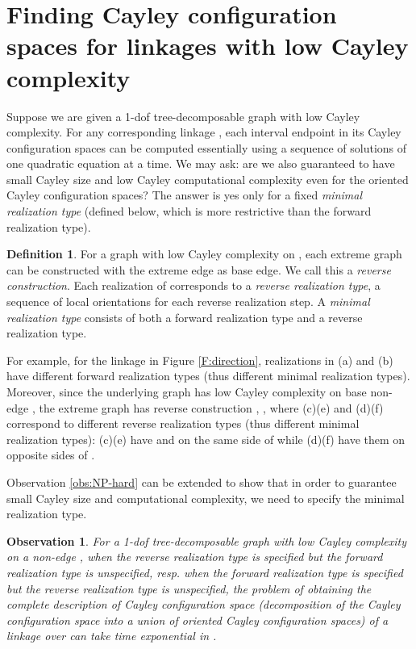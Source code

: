 \documentclass[secthm,amsthm,english]{article}
\newtheorem{observation}{Observation}
\theoremstyle{definition}
\newtheorem{definition}{Definition}
\theoremstyle{remark}
\begin{document}
\section{Finding Cayley configuration spaces for linkages with low Cayley complexity} 
\label{sec:Find-Cayley-configuration}


Suppose we are given a 1-dof tree-decomposable graph  with low Cayley complexity. 
For any corresponding linkage , 
each interval endpoint in its Cayley configuration spaces can be computed essentially using
a sequence of solutions of one quadratic equation at a time. 
We may ask: are we also guaranteed to have small Cayley size and low Cayley
computational complexity even for the oriented Cayley configuration spaces? 
The answer is yes only for a fixed \emph{minimal realization type} 
(defined below, which is more restrictive than the forward realization type). 

\begin{definition}
For a graph  with low Cayley complexity on , each extreme graph 
can be constructed with the extreme edge  as base edge. We call this a {\emph{reverse construction}}. 
Each realization of  corresponds to a {\emph{reverse realization type}}, a sequence of local orientations for each reverse realization step.
A {\emph{minimal realization type}} consists of both a forward realization type and a reverse realization type.
\end{definition}





For example,  for the linkage in Figure \ref{F:direction},  
realizations in (a) and (b) have different forward realization types (thus different minimal realization types). 
Moreover,  since the underlying graph has low Cayley complexity on base non-edge , 
the extreme graph  has reverse construction , ,  
where (c)(e) and (d)(f) correspond to different reverse  realization types (thus different minimal realization types):
(c)(e) have  and  on the same side of 
while (d)(f) have them on opposite sides of . 

\medskip

Observation \ref{obs:NP-hard} can be extended to show that in order
to guarantee small Cayley size and computational complexity, we need to specify the minimal realization type.

\begin{observation} \label{obs: no-orientation}
For a 1-dof tree-decomposable graph  with low Cayley complexity on a non-edge , 
when the reverse realization type is specified but the forward realization type is unspecified, 
resp. when the forward realization type is specified but the reverse realization type is unspecified, 
the problem of obtaining the complete description of Cayley configuration space
(decomposition of the Cayley configuration space into a union of oriented Cayley configuration spaces)
of a linkage  over  can take time exponential  in .
\end{observation}
\end{document}
